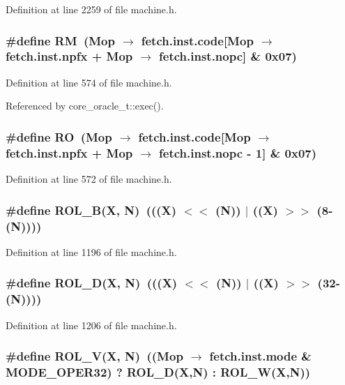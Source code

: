 Definition at line 2259 of file machine.h.
\subsubsection[{RM}]{\setlength{\rightskip}{0pt plus 5cm}\#define RM~(Mop $\rightarrow$ fetch.inst.code[Mop $\rightarrow$ fetch.inst.npfx + Mop $\rightarrow$ fetch.inst.nopc] \& 0x07)}\label{machine_8h_4608958cdf4c8b8ff0a6e301c4c23ae1}




Definition at line 574 of file machine.h.

Referenced by core\_\-oracle\_\-t::exec().
\subsubsection[{RO}]{\setlength{\rightskip}{0pt plus 5cm}\#define RO~(Mop $\rightarrow$ fetch.inst.code[Mop $\rightarrow$ fetch.inst.npfx + Mop $\rightarrow$ fetch.inst.nopc - 1] \& 0x07)}\label{machine_8h_628642b04c07236ae1e986c248a79ae5}




Definition at line 572 of file machine.h.
\subsubsection[{ROL\_\-B}]{\setlength{\rightskip}{0pt plus 5cm}\#define ROL\_\-B(X, \/  N)~(((X) $<$$<$ (N)) $|$ ((X) $>$$>$ (8-(N))))}\label{machine_8h_fdbb09debc9fe21310e3fd764855bfd3}




Definition at line 1196 of file machine.h.
\subsubsection[{ROL\_\-D}]{\setlength{\rightskip}{0pt plus 5cm}\#define ROL\_\-D(X, \/  N)~(((X) $<$$<$ (N)) $|$ ((X) $>$$>$ (32-(N))))}\label{machine_8h_990f909d313a031f4632c3c609f84dbe}




Definition at line 1206 of file machine.h.
\subsubsection[{ROL\_\-V}]{\setlength{\rightskip}{0pt plus 5cm}\#define ROL\_\-V(X, \/  N)~((Mop $\rightarrow$ fetch.inst.mode \& MODE\_\-OPER32) ? ROL\_\-D(X,N) : ROL\_\-W(X,N))}\label{machine_8h_0f605946a9779f3e5cb288f08efd6426}




